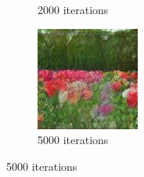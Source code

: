 \documentclass{article}
\begin{document}
\begin{figure}[h!]
\begin{subfigure}[b]{0.24\textwidth}
         \caption{2000 iterations}
     \end{subfigure}
     \begin{subfigure}[b]{0.24\textwidth}
         \centering
         \includegraphics[width=\textwidth]{illustration/flower_sngan_5000.jpg}
         \caption{5000 iterations}
     \end{subfigure}
\end{figure}
\end{document}
